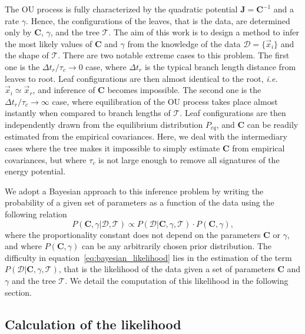 \documentclass[preprint,amsmath,amssymb,superscriptaddress,showpacs,pre]{revtex4-1}
\def\vx{\vec x}
\begin{document}
The OU process is fully characterized by the quadratic potential $\bm J = \bm C^{-1}$ and a rate $\gamma$. 
Hence, the configurations of the leaves, that is the data, are determined only by $\bm C$, $\gamma$, and the tree $\mathcal{T}$. 
The aim of this work is to design a method to infer the most likely values of $\bm C$ and $\gamma$ from the knowledge of the data $\mathcal{D}=\{\vx_i\}$ and the shape of $\mathcal{T}$. 
There are two notable extreme cases to this problem. 
The first one is the $\Delta t_r/\tau_c\longrightarrow 0$ case, where $\Delta t_r$ is the typical branch length distance from leaves to root. 
Leaf configurations are then almost identical to the root, \emph{i.e.} $\vx_i\simeq\vx_r$, and inference of $\bm C$ becomes impossible. 
The second one is the $\Delta t_r/\tau_c\longrightarrow\infty$ case, where equilibration of the OU process takes place almost instantly when compared to branch lengths of $\mathcal{T}$.
Leaf configurations are then independently drawn from the equilibrium distribution $P_{eq}$, and $\bm C$ can be readily estimated from the empirical covariances. 
Here, we deal with the intermediary cases where the tree makes it impossible to simply estimate $\bm C$ from empirical covariances, but where $\tau_c$ is not large enough to remove all signatures of the energy potential. 

We adopt a Bayesian approach to this inference problem by writing the probability of a given set of parameters as a function of the data using the following relation
\begin{equation}
	P(\bm C, \gamma\vert\mathcal{D},\mathcal{T}) \propto P(\mathcal{D}\vert\bm C, \gamma,\mathcal{T})\cdot P(\bm C, \gamma),
	\label{eq:bayesian_likelihood}
\end{equation}
where the proportionality constant does not depend on the parameters $\bm C$ or $\gamma$, and where $P(\bm C, \gamma)$ can be any arbitrarily chosen prior distribution. The difficulty in equation~\ref{eq:bayesian_likelihood} lies in the estimation of the term $P(\mathcal{D}\vert\bm C, \gamma, \mathcal{T})$, that is the likelihood of the data given a set of parameters $\bm C$ and $\gamma$ and the tree $\mathcal{T}$.  We detail the computation of this likelihood in the following section. 

\subsection{Calculation of the likelihood} %
\label{sub:Calculation_of_the_likelihood}
 
\end{document}
